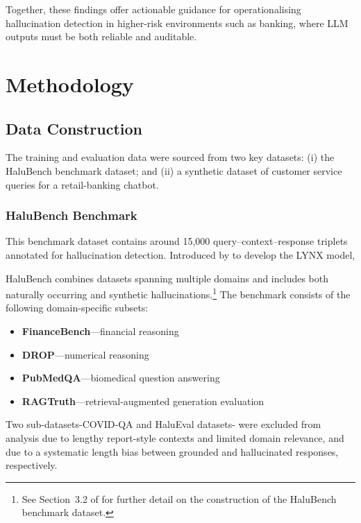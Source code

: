 \documentclass[11pt]{article}
\begin{document}
Together, these findings offer actionable guidance for operationalising hallucination detection in higher-risk environments such as banking, where LLM outputs must be both reliable and auditable.

\section{Methodology}

\subsection{Data Construction}

The training and evaluation data were sourced from two key datasets: (i) the HaluBench benchmark dataset; and (ii) a synthetic dataset of customer service queries for a retail-banking chatbot.

\subsubsection*{HaluBench Benchmark}
This benchmark dataset contains around 15,000 query–context–response triplets annotated for hallucination detection. Introduced by \citet{ravi2024lynx} to develop the LYNX model, 

HaluBench combines datasets spanning multiple domains and includes both naturally occurring and synthetic hallucinations.\footnote{See Section~3.2 of \citet{ravi2024lynx} for further detail on the construction of the HaluBench benchmark dataset.}
 The benchmark consists of the following domain-specific subsets:

\begin{itemize}
    \item \textbf{FinanceBench}—financial reasoning~\citep{islam2023financebench}
    \item \textbf{DROP}—numerical reasoning~\citep{dua2019drop}
    \item \textbf{PubMedQA}—biomedical question answering~\citep{jin2019pubmedqa}
    \item \textbf{RAGTruth}—retrieval-augmented generation evaluation~\citep{wu2023ragtruth}
\end{itemize}

Two sub-datasets-COVID-QA \citep{moller2020covidqa} and HaluEval \citep{li2023halueval} datasets- were excluded from analysis due to lengthy report-style contexts and limited domain relevance, and due to a systematic length bias between grounded and hallucinated responses, respectively.
\end{document}
